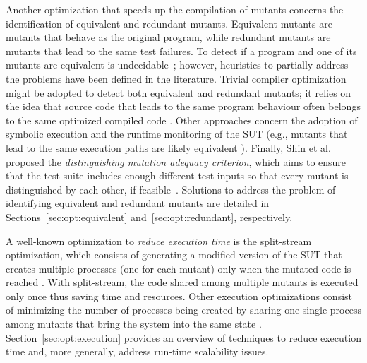 Another optimization that speeds up the compilation of mutants concerns the identification of equivalent and redundant mutants. Equivalent mutants are mutants that behave as the original program, while redundant mutants are mutants that lead to the same test failures. 
To detect if a program and one of its mutants are
equivalent is undecidable~\cite{Budd:1982}; however, heuristics to partially address the problems have been defined in the literature.
Trivial compiler optimization might be adopted to detect both equivalent and redundant mutants; it relies on the idea that source code that leads to the same program behaviour often belongs to the same optimized compiled code \cite{papadakis2015trivial}. Other approaches concern the adoption of symbolic execution \cite{papadakis2012mutation,kurtz2015static} and the runtime monitoring of the SUT (e.g., mutants that lead to the same execution paths are likely equivalent \cite{schuler2013covering}). Finally, Shin et al. proposed the \emph{distinguishing mutation adequacy criterion}, which aims to ensure that the test suite includes enough different test inputs so that every mutant is distinguished by each other, if feasible~\cite{shin2017theoretical}. 
Solutions to address the problem of identifying equivalent and redundant mutants are detailed in Sections~\ref{sec:opt:equivalent} and~\ref{sec:opt:redundant}, respectively.






A well-known optimization to \emph{reduce execution time} is the split-stream optimization, which consists of generating a modified version of the SUT that creates multiple processes (one for each mutant) only when the mutated code is reached \cite{tokumoto2016muvm}. With split-stream, the code shared among multiple mutants is executed only once thus saving time and resources. Other execution optimizations consist of minimizing the number of processes being created by sharing one single process among mutants that bring the system into the same state \cite{wang2017faster}.
Section~\ref{sec:opt:execution} provides an overview of techniques to reduce execution time and, more generally, address run-time scalability issues.



